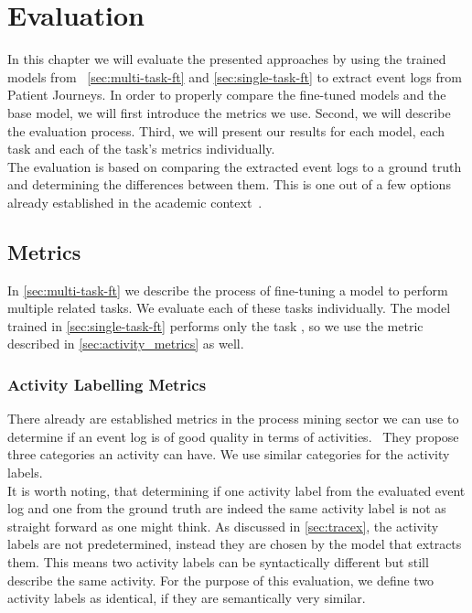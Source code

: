 \section{Evaluation}\label{sec:eval}
In this chapter we will evaluate the presented approaches by using the trained models from ~\autoref{sec:multi-task-ft} and \autoref{sec:single-task-ft} to extract event logs from Patient Journeys. In order to properly compare the fine-tuned models and the base model, we will first introduce the metrics we use. Second, we will describe the evaluation process. Third, we will present our results for each model, each task and each of the task's metrics individually.\\
The evaluation is based on comparing the extracted event logs to a ground truth and determining the differences between them. This is one out of a few options already established in the academic context~\cite{latif_fine-tuning_2024}.

\subsection{Metrics}\label{sec:metrics}
In \autoref{sec:multi-task-ft} we describe the process of fine-tuning a model to perform multiple related tasks. We evaluate each of these tasks individually. The model trained in \autoref{sec:single-task-ft} performs only the task , so we use the metric described in \autoref{sec:activity_metrics} as well.

\subsubsection{Activity Labelling Metrics}\label{sec:activity_metrics}
There already are established metrics in the process mining sector we can use to determine if an event log is of good quality in terms of activities.~\cite{van_der_aalst_process_2016, carmona_conformance_2018} They propose three categories an activity can have. We use similar categories for the activity labels.\\
It is worth noting, that determining if one activity label from the evaluated event log and one from the ground truth are indeed the same activity label is not as straight forward as one might think. As discussed in \autoref{sec:tracex}, the activity labels are not predetermined, instead they are chosen by the model that extracts them. This means two activity labels can be syntactically different but still describe the same activity. For the purpose of this evaluation, we define two activity labels as identical, if they are semantically very similar.
